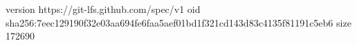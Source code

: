 version https://git-lfs.github.com/spec/v1
oid sha256:7eec129190f32e03aa694fe6faa5aef01bd1f321cd143d83c4135f81191c5eb6
size 172690
